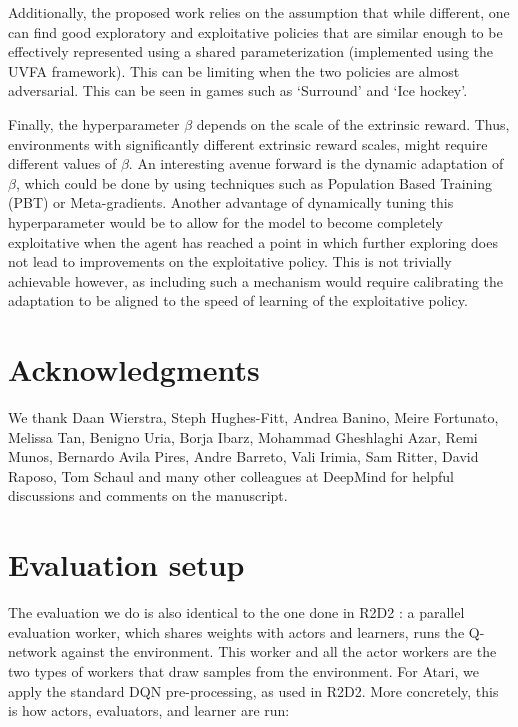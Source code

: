 \documentclass{article} %
\begin{document}
Additionally, the proposed work relies on the assumption that while different, one can find good exploratory and exploitative policies that are similar enough to be effectively represented using a shared parameterization (implemented using the UVFA framework). This can be limiting when the two policies are almost adversarial. This can be seen in games such as ‘Surround’ and ‘Ice hockey’.

Finally, the hyperparameter $\beta$ depends on the scale of the extrinsic reward. Thus, environments with significantly different extrinsic reward scales, might require different values of $\beta$. An interesting avenue forward is the dynamic adaptation of $\beta$, which could be done by using techniques such as Population Based Training (PBT)\citep{jaderberg2017population} or Meta-gradients\citep{xu2018meta}. Another advantage of dynamically tuning this hyperparameter would be to allow for the model to become completely exploitative when the agent has reached a point in which further exploring does not lead to improvements on the exploitative policy. This is not trivially achievable however, as including such a mechanism would require calibrating the adaptation to be aligned to the speed of learning of the exploitative policy. 

\section*{Acknowledgments}
We thank Daan Wierstra, Steph Hughes-Fitt, Andrea Banino, Meire Fortunato, Melissa Tan, Benigno Uria, Borja Ibarz, Mohammad Gheshlaghi Azar, Remi Munos, Bernardo Avila Pires, Andre Barreto, Vali Irimia, Sam Ritter, David Raposo, Tom Schaul and many other colleagues at DeepMind for helpful discussions and comments on the manuscript.

% 


\clearpage
\newpage


\appendix

\section{Evaluation setup}
\label{evaluation_setup}
The evaluation we do is also identical to the one done in R2D2 \cite{r2d2}: a parallel evaluation worker, which shares weights with actors and learners, runs the Q-network against the environment. This worker and all the actor workers are the two types of workers that draw samples from the environment. For Atari, we apply the standard DQN pre-processing, as used in R2D2. More concretely, this is how actors, evaluators, and learner are run:
\end{document}
